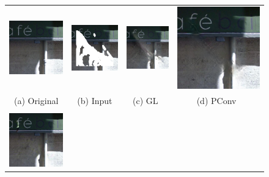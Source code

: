 \documentclass[10pt,journal,compsoc]{IEEEtran}
\begin{document}
\maketitle
\thispagestyle{plain}
\begin{figure}[hbt]
	\small
	\setlength{\tabcolsep}{2.0pt}
	\centering
		\begin{tabular}{cccc}
		\includegraphics[width=.234\textwidth]{paris/GT28-1}  &
		\includegraphics[width=.234\textwidth]{paris/input28-1}  &
		\includegraphics[width=.234\textwidth]{paris/gl28-1}  &
		\includegraphics[width=.234\textwidth]{paris/pconv28-1} \\
		\scriptsize{(a) Original} & \scriptsize{(b) Input} &  \scriptsize{(c) GL~\cite{IizukaGL}} & \scriptsize{(d) PConv~\cite{partialconv2017}}\\
		\vspace{-2mm}\\
		\includegraphics[width=.234\textwidth]{paris/gc28-1}  &

\end{tabular}
\end{figure}
\end{document}

